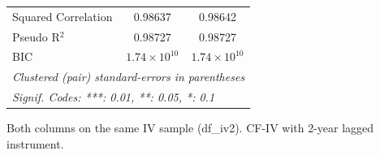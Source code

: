 \begin{table}[htbp]
\begin{tabular}{lcc}
      Squared Correlation & 0.98637               & 0.98642\\  
      Pseudo R$^2$        & 0.98727               & 0.98727\\  
      BIC                 & $1.74\times 10^{10}$  & $1.74\times 10^{10}$\\   
      \midrule \midrule
      \multicolumn{3}{l}{\emph{Clustered (pair) standard-errors in parentheses}}\\
      \multicolumn{3}{l}{\emph{Signif. Codes: ***: 0.01, **: 0.05, *: 0.1}}\\
   \end{tabular}
   
   \par \raggedright 
   Both columns on the same IV sample (df\_iv2). CF-IV with 2-year lagged instrument.
\end{table}


